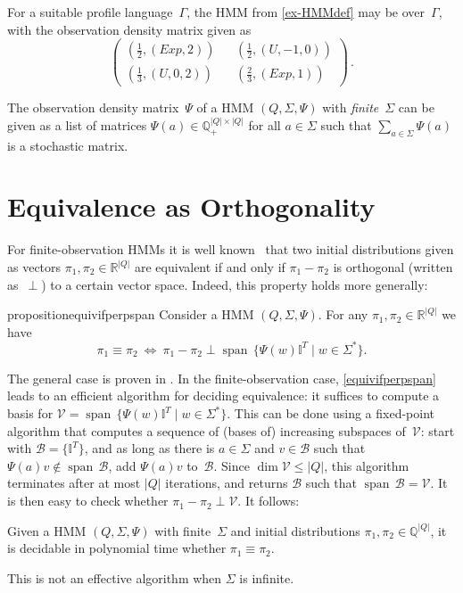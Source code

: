 \documentclass[a4paper,UKenglish,cleveref, autoref,mathscr, amsthm, thmtools, thm-restate]{lipics-v2019}
\newcommand{\RR}{\mathbb{R}}
\newcommand{\QQ}{\mathbb{Q}}
\newcommand{\Exp}{\mathit{Exp}}
\newcommand{\1}{\mathbb{I}}
\DeclareMathOperator{\Span}{span\,}
\begin{document}
\begin{example} \label{ex-encoding-prelims}
For a suitable profile language~$\Gamma$, the HMM from \cref{ex-HMMdef} may be over~$\Gamma$, with the observation density matrix given as
\begin{equation}
\begin{pmatrix}
(\frac12, (\Exp,2)) && (\frac12, (U,-1,0)) \\
(\frac13, (U,0,2))  && (\frac23, (\Exp,1))
\end{pmatrix}\,. \tag*{\qed}
\end{equation}
\end{example}
The observation density matrix~$\Psi$ of a HMM $(Q, \Sigma, \Psi)$ with \emph{finite}~$\Sigma$ can be given as a
list of matrices $\Psi(a) \in \QQ_+^{|Q| \times |Q|}$ for all $a \in \Sigma$ such that $\sum_{a \in \Sigma} \Psi(a)$ is a stochastic matrix.

\section{Equivalence as Orthogonality} \label{sec-equivalence-as-orthogonality}

For finite-observation HMMs it is well known~\cite{schut61,Paz71,Tzeng92,CortesMRdistance} that two initial distributions given as vectors $\pi_1, \pi_2 \in \RR^{|Q|}$ are equivalent if and only if $\pi_1 - \pi_2$ is orthogonal (written as~$\perp$) to a certain vector space.
Indeed, this property holds more generally:

\begin{restatable}{proposition}{equivifperpspan}\label{equivifperpspan}
Consider a HMM $(Q, \Sigma, \Psi)$.
For any $\pi_1, \pi_2 \in \RR^{|Q|}$ we have
\[\pi_1 \equiv \pi_2 \ \iff \ \pi_1 - \pi_2 \perp \Span \{\Psi(w)\1^T \mid w \in \Sigma^*\}.\]
\end{restatable}
The general case is proven in \cite{darkief20tech}. In the finite-observation case, \cref{equivifperpspan} leads to an efficient algorithm for deciding equivalence: it suffices to compute a basis for $\mathcal{V} = \Span \{\Psi(w)\1^T \mid w \in \Sigma^*\}$.
This can be done using a fixed-point algorithm that computes a sequence of (bases of) increasing subspaces of~$\mathcal{V}$: start with $\mathcal{B} = \{\1^T\}$, and as long as there is $a \in \Sigma$ and $v \in \mathcal{B}$ such that $\Psi(a) v \not\in \Span \mathcal{B}$, add $\Psi(a) v$ to~$\mathcal{B}$.
Since $\dim \mathcal{V} \le |Q|$, this algorithm terminates after at most $|Q|$ iterations, and returns $\mathcal{B}$ such that $\Span \mathcal{B} = \mathcal{V}$.
It is then easy to check whether $\pi_1 - \pi_2 \perp \mathcal{V}$.
It follows:
\begin{proposition} \label{prop-finite-HMM}
Given a HMM $(Q, \Sigma, \Psi)$ with finite~$\Sigma$ and initial distributions $\pi_1, \pi_2 \in \QQ^{|Q|}$, it is decidable in polynomial time whether $\pi_1 \equiv \pi_2$.
\end{proposition}
This is not an effective algorithm when $\Sigma$ is infinite.
\end{document}
